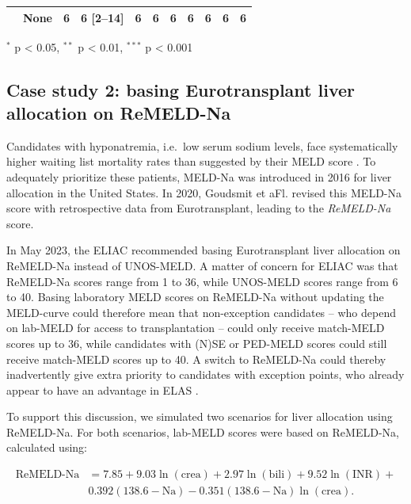 \documentclass[11pt,twoside,]{book}
\begin{document}
\begin{table}[h]
{\begin{tabular}{C{.18\linewidth}C{.10\linewidth}C{.09\linewidth}C{.19\linewidth}C{.10\linewidth}C{.10\linewidth}C{.09\linewidth}C{.15\linewidth}C{.10\linewidth}C{.11\linewidth}C{.11\linewidth}}
 & None & 6 & \phantom{00}\num{6} [\numrange{2}{14}] & 6 & 6 & 6 & 6 & 6 & 6 & 6\\
\bottomrule
\end{tabular}
}
\parbox{\textwidth}{\footnotesize \smallskip $^{*}$ p < 0.05, $^{**}$ p < 0.01, $^{***}$ p < 0.001}
\end{table}

\endgroup

\FloatBarrier
\vfill

\subsection{Case study 2: basing Eurotransplant liver allocation on ReMELD-Na}\label{sec:elasremeldcasestudy}

Candidates with hyponatremia, i.e.~low serum sodium levels, face systematically
higher waiting list mortality rates than suggested by
their MELD score \citep{kimHyponatremiaMortalityPatients2008a}. To adequately
prioritize these patients, MELD-Na was introduced in 2016 for liver allocation
in the United States. In 2020, Goudsmit et aFl. revised this MELD-Na score with retrospective
data from Eurotransplant, leading to the \emph{ReMELD-Na} score.

In May 2023, the ELIAC recommended basing Eurotransplant liver allocation
on ReMELD-Na instead of UNOS-MELD. A matter of concern for ELIAC was
that ReMELD-Na scores range from 1 to 36, while UNOS-MELD scores range
from 6 to 40. Basing laboratory MELD scores on ReMELD-Na without
updating the MELD-curve could therefore mean that non-exception
candidates -- who depend on lab-MELD for access to transplantation -- could
only receive match-MELD scores up to 36, while candidates with (N)SE
or PED-MELD scores could still receive match-MELD scores up to 40. A
switch to ReMELD-Na could thereby inadvertently give extra priority to
candidates with exception points, who already appear to have an advantage in ELAS
\citep{umgelterDisparitiesEurotransplantLiver2017a}.

To support this discussion, we simulated two scenarios for liver allocation using
ReMELD-Na. For both scenarios, lab-MELD scores were based on ReMELD-Na, calculated
using:

\[
\begin{aligned}
\text{ReMELD-Na} &= 7.85 + 9.03\ln(\text{crea}) + 2.97\ln(\text{bili}) + 9.52\ln(\text{INR}) + \\
& 0.392(138.6 - \text{Na}) - 0.351(138.6 - \text{Na})\ln(\text{crea}).
\end{aligned}
\]
\end{document}
